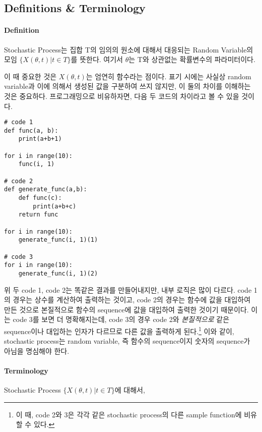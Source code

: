 \documentclass[twoside]{article}
\theoremstyle{definition}
\begin{document}
\subsection{Definitions \& Terminology}     

\paragraph{Definition} Stochastic Process는 집합 T의 임의의 원소에 대해서 대응되는 Random Variable의 모임 $\{X(\theta, t)|t \in T\}$를 뜻한다. 여기서 $\theta$는 T와 상관없는 확률변수의 파라미터이다. 


이 때 중요한 것은 $X(\theta, t)$는 엄연히 함수라는 점이다. 표기 시에는 사실상 random variable과 이에 의해서 생성된 값을 구분하여 쓰지 않지만, 이 둘의 차이를 이해하는 것은 중요하다. 프로그래밍으로 비유하자면, 다음 두 코드의 차이라고 볼 수 있을 것이다. 

\begin{lstlisting}[style=python]
# code 1
def func(a, b):
    print(a+b+1)    

for i in range(10):
    func(i, 1)
    
# code 2
def generate_func(a,b):
    def func(c):
        print(a+b+c)
    return func

for i in range(10):
    generate_func(i, 1)(1)
    
# code 3
for i in range(10):
    generate_func(i, 1)(2)
\end{lstlisting}

위 두 code 1, code 2는 똑같은 결과를 만들어내지만, 내부 로직은 많이 다르다. code 1의 경우는 상수를 계산하여 출력하는 것이고, code 2의 경우는 함수에 값을 대입하여 만든 것으로 본질적으로 함수의 sequence에 값을 대입하여 출력한 것이기 때문이다. 이는 code 3를 보면 더 명확해지는데, code 3의 경우 code 2와 \textit{본질적으로} 같은 sequence이나 대입하는 인자가 다르므로 다른 값을 출력하게 된다.\footnote{이 때, code 2와 3은 각각 같은 stochastic process의 다른 sample function에 비유할 수 있다.}  이와 같이, stochastic process는 random variable, 즉 함수의 sequence이지 숫자의 sequence가 아님을 명심해야 한다.  

\paragraph{Terminology}

Stochastic Process $\{X(\theta, t)|t \in T\}$에 대해서, 
\end{document}
